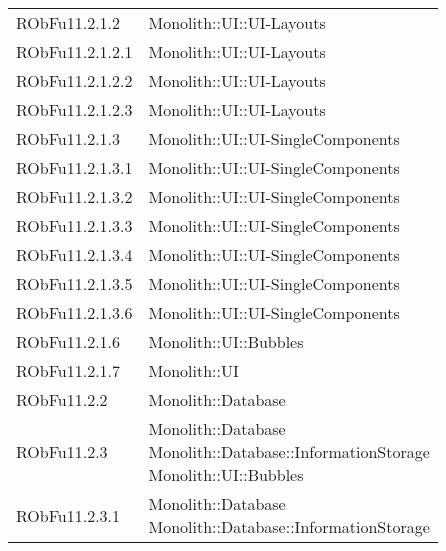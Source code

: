 \begin{center}
\begin{longtable}{|
*{1}{>{\centering\arraybackslash}m{2.5cm}|}
*{1}{>{\centering\arraybackslash}m{7.5cm}|}}
{\\}\\\hline
RObFu11.2.1.2 & \makecell[l]{Monolith::UI::UI-Layouts
\\}\\\hline
RObFu11.2.1.2.1 & \makecell[l]{Monolith::UI::UI-Layouts
\\}\\\hline
RObFu11.2.1.2.2 & \makecell[l]{Monolith::UI::UI-Layouts
\\}\\\hline
RObFu11.2.1.2.3 & \makecell[l]{Monolith::UI::UI-Layouts
\\}\\\hline
RObFu11.2.1.3 & \makecell[l]{Monolith::UI::UI-SingleComponents
\\}\\\hline
RObFu11.2.1.3.1 & \makecell[l]{Monolith::UI::UI-SingleComponents
\\}\\\hline
RObFu11.2.1.3.2 & \makecell[l]{Monolith::UI::UI-SingleComponents
\\}\\\hline
RObFu11.2.1.3.3 & \makecell[l]{Monolith::UI::UI-SingleComponents
\\}\\\hline
RObFu11.2.1.3.4 & \makecell[l]{Monolith::UI::UI-SingleComponents
\\}\\\hline
RObFu11.2.1.3.5 & \makecell[l]{Monolith::UI::UI-SingleComponents
\\}\\\hline
RObFu11.2.1.3.6 & \makecell[l]{Monolith::UI::UI-SingleComponents
\\}\\\hline
RObFu11.2.1.6 & \makecell[l]{Monolith::UI::Bubbles
\\}\\\hline
RObFu11.2.1.7 & \makecell[l]{Monolith::UI
\\}\\\hline
RObFu11.2.2 & \makecell[l]{Monolith::Database
\\}\\\hline
RObFu11.2.3 & \makecell[l]{Monolith::Database
\\Monolith::Database::InformationStorage
\\Monolith::UI::Bubbles
\\}\\\hline
RObFu11.2.3.1 & \makecell[l]{Monolith::Database
\\Monolith::Database::InformationStorage
}
\end{longtable}
\end{center}
